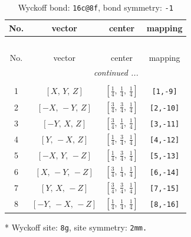 \documentclass[fleqn,8pt]{jsarticle}
\begin{document}
\renewcommand{\arraystretch}{1.2}
\begin{longtable}{cccc}
\caption{Wyckoff bond: {\tt 16c@8f}, bond symmetry: {\tt -1}}
 \\
 \hline \hline
No. & vector & center & mapping \\ \hline \endfirsthead

\multicolumn{3}{l}{\tablename\ \thetable{}} \\
 \hline \hline
No. & vector & center & mapping \\ \hline \endhead

 \hline \hline
\multicolumn{3}{r}{\footnotesize\it continued ...} \\ \endfoot

 \hline \hline
\multicolumn{3}{r}{} \\ \endlastfoot

1 & $\left[ X,\, Y,\, Z \right]$ & $\left[ \frac{1}{4},\, \frac{1}{4},\, \frac{1}{4} \right]$ & {\tt [1,-9]} \\ \hline
2 & $\left[ - X,\, - Y,\, Z \right]$ & $\left[ \frac{3}{4},\, \frac{3}{4},\, \frac{1}{4} \right]$ & {\tt [2,-10]} \\ \hline
3 & $\left[ - Y,\, X,\, Z \right]$ & $\left[ \frac{3}{4},\, \frac{1}{4},\, \frac{1}{4} \right]$ & {\tt [3,-11]} \\ \hline
4 & $\left[ Y,\, - X,\, Z \right]$ & $\left[ \frac{1}{4},\, \frac{3}{4},\, \frac{1}{4} \right]$ & {\tt [4,-12]} \\ \hline
5 & $\left[ - X,\, Y,\, - Z \right]$ & $\left[ \frac{1}{4},\, \frac{3}{4},\, \frac{1}{4} \right]$ & {\tt [5,-13]} \\ \hline
6 & $\left[ X,\, - Y,\, - Z \right]$ & $\left[ \frac{3}{4},\, \frac{1}{4},\, \frac{1}{4} \right]$ & {\tt [6,-14]} \\ \hline
7 & $\left[ Y,\, X,\, - Z \right]$ & $\left[ \frac{3}{4},\, \frac{3}{4},\, \frac{1}{4} \right]$ & {\tt [7,-15]} \\ \hline
8 & $\left[ - Y,\, - X,\, - Z \right]$ & $\left[ \frac{1}{4},\, \frac{1}{4},\, \frac{1}{4} \right]$ & {\tt [8,-16]} \\
\end{longtable}
* Wyckoff site: {\tt 8g}, site symmetry: {\tt 2mm.}
\renewcommand{\arraystretch}{1.2}
\end{document}
